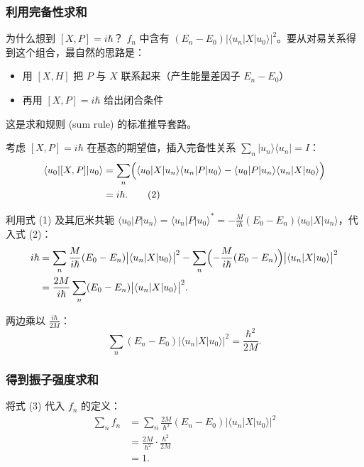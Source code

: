 \subsubsection{利用完备性求和}

\begin{thinkbox}{为什么想到 $[X,P]=i\hbar$？}
$f_n$ 中含有 $(E_n-E_0)|\langle u_n|X|u_0\rangle|^2$。要从对易关系得到这个组合，最自然的思路是：
\begin{itemize}
  \item 用 $[X,H]$ 把 $P$ 与 $X$ 联系起来（产生能量差因子 $E_n-E_0$）
  \item 再用 $[X,P]=i\hbar$ 给出闭合条件
\end{itemize}
这是求和规则 (sum rule) 的标准推导套路。
\end{thinkbox}

考虑 $[X,P]=i\hbar$ 在基态的期望值，插入完备性关系 $\sum_n |u_n\rangle\langle u_n| = I$：
\begin{align*}
  \langle u_0|[X,P]|u_0\rangle
  &= \sum_n \Bigl(
       \langle u_0|X|u_n\rangle\langle u_n|P|u_0\rangle
       - \langle u_0|P|u_n\rangle\langle u_n|X|u_0\rangle
     \Bigr) \\
  &= i\hbar. \tag{2}
\end{align*}

利用式 (1) 及其厄米共轭 $\langle u_0|P|u_n\rangle = \langle u_n|P|u_0\rangle^* = -\frac{M}{i\hbar}(E_0-E_n)\langle u_0|X|u_n\rangle$，代入式 (2)：
\begin{align*}
  i\hbar
  &= \sum_n \frac{M}{i\hbar}(E_0-E_n)\bigl|\langle u_n|X|u_0\rangle\bigr|^2
   - \sum_n \Bigl(-\frac{M}{i\hbar}(E_0-E_n)\Bigr)\bigl|\langle u_n|X|u_0\rangle\bigr|^2 \\
  &= \frac{2M}{i\hbar}\sum_n (E_0-E_n)\bigl|\langle u_n|X|u_0\rangle\bigr|^2.
\end{align*}

两边乘以 $\frac{i\hbar}{2M}$：
\[
  \sum_n (E_n-E_0)\bigl|\langle u_n|X|u_0\rangle\bigr|^2 = \frac{\hbar^2}{2M}. \tag{3}
\]

\subsubsection{得到振子强度求和}

将式 (3) 代入 $f_n$ 的定义：
\begin{align*}
  \sum_n f_n
  &= \sum_n \frac{2M}{\hbar^2}(E_n-E_0)\bigl|\langle u_n|X|u_0\rangle\bigr|^2 \\
  &= \frac{2M}{\hbar^2} \cdot \frac{\hbar^2}{2M} \\
  &= \boxed{1}.
\end{align*}


